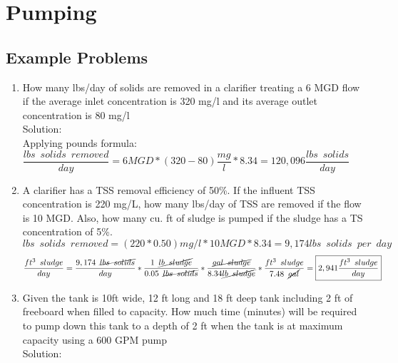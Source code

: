 \documentclass{article}
\begin{document}
\newpage

\section{Pumping}

\subsection{Example Problems} 


\begin{enumerate}

\item How many lbs/day of solids are removed in a clarifier treating a 6 MGD flow if the average inlet concentration is 320 mg/l and its average outlet concentration is 80 mg/l\\
\vspace{0.5cm}
Solution:\\
\vspace{0.5cm}
Applying pounds formula:\\
$\dfrac{lbs \enspace solids \enspace removed}{day}=6MGD*(320-80)\dfrac{mg}{l}*8.34=\boxed{120,096\dfrac{lbs \enspace solids}{day}}$

\item A clarifier has a TSS removal efficiency of 50\%.  If the influent TSS concentration is 220 mg/L, how many lbs/day of TSS are removed if the flow is 10 MGD.  Also, how many cu. ft of sludge is pumped if the sludge has a TS concentration of 5\%.\\
$lbs \enspace solids \enspace removed=(220*0.50)mg/l*10MGD*8.34=9,174lbs \enspace solids \enspace per \enspace day$
$$\dfrac{ft^3\enspace sludge}{day}= \dfrac{9,174 \enspace \cancel{lbs \enspace solids}}{day} * \dfrac{1 \enspace \cancel{lb \enspace sludge}}{0.05\enspace \cancel{lbs \enspace solids}}*\dfrac{\cancel{gal \enspace sludge}}{8.34\cancel{lb \enspace sludge}}*\dfrac{ft^3 \enspace sludge}{7.48 \enspace \cancel{gal}}=\boxed{2,941\dfrac{ft^3 \enspace sludge}{day}} $$

\item Given the tank is 10ft wide, 12 ft long and 18 ft deep tank including 2 ft of freeboard when filled to capacity. How much time (minutes) will be required to pump down this tank to a depth of 2 ft when the tank is at maximum capacity using a 600 GPM pump\\
Solution:\\
\vspace{0.5cm}


\end{enumerate}
\end{document}
